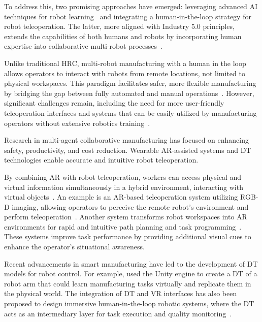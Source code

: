 To address this, two promising approaches have emerged: leveraging advanced \ac{AI} techniques for robot learning~\cite{6-ar-dt} and integrating a human-in-the-loop strategy for robot teleoperation. The latter, more aligned with Industry 5.0 principles, extends the capabilities of both humans and robots by incorporating human expertise into collaborative multi-robot processes~\cite{7-ar-dt}.

Unlike traditional \ac{HRC}, multi-robot manufacturing with a human in the loop allows operators to interact with robots from remote locations, not limited to physical workspaces. This paradigm facilitates safer, more flexible manufacturing by bridging the gap between fully automated and manual operations~\cite{7-ar-dt}. However, significant challenges remain, including the need for more user-friendly teleoperation interfaces and systems that can be easily utilized by manufacturing operators without extensive robotics training~\cite{9-ar-dt}.

Research in multi-agent collaborative manufacturing has focused on enhancing safety, productivity, and cost reduction. Wearable \ac{AR}-assisted systems and \ac{DT} technologies enable accurate and intuitive robot teleoperation. 

By combining \ac{AR} with robot teleoperation, workers can access physical and virtual information simultaneously in a hybrid environment, interacting with virtual objects~\cite{26-ar-dt,27-ar-dt}. An example is an \ac{AR}-based teleoperation system utilizing RGB-D imaging, allowing operators to perceive the remote robot's environment and perform teleoperation~\cite{10-ar-dt}. Another system transforms robot workspaces into \ac{AR} environments for rapid and intuitive path planning and task programming~\cite{30-ar-dt}. These systems improve task performance by providing additional visual cues to enhance the operator's situational awareness.

Recent advancements in smart manufacturing have led to the development of \ac{DT} models for robot control. For example, \cite{37-ar-dt} used the Unity engine to create a \ac{DT} of a robot arm that could learn manufacturing tasks virtually and replicate them in the physical world. The integration of \ac{DT} and \ac{VR} interfaces has also been proposed to design immersive human-in-the-loop robotic systems, where the \ac{DT} acts as an intermediary layer for task execution and quality monitoring~\cite{41-ar-dt,42-ar-dt}.


